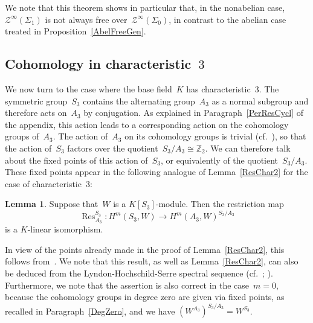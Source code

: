 \documentclass[12pt]{article}
\makeatletter
\theoremstyle{definition}
\newtheorem{Lemma}[Satz]{Lemma}
\theoremstyle{break}
\renewenvironment{proof}[1][\proofname]{\par
\vspace{-5pt}%
\pushQED{\qed}%
\normalfont
\topsep0pt \partopsep0pt %
\trivlist
\item[\hskip\labelsep
\bfseries
#1\@addpunct{.}]\ignorespaces
}{%
\popQED\endtrivlist\@endpefalse
\addvspace{6pt plus 6pt} %
}
\newcommand{\Z}{\mathbb{Z}}
\DeclareMathOperator\Res{Res}
\renewcommand{\1}{\mathbbm{1}}
\newcommand{\TFT}{\mathcal{Z}}
\makeatother
\begin{document}
We note that this theorem shows in particular that, in the nonabelian case,~$\TFT^\infty(\Sigma_1)$ is not always free over~$\TFT^\infty(\Sigma_0)$, in contrast to the abelian case treated in Proposition~\ref{AbelFreeGen}.


\subsection{Cohomology in characteristic~$3$} \label{Char3}
We now turn to the case where the base field~$K$ has characteristic~$3$. The symmetric group~$S_3$ contains the alternating group~$A_3$ as a normal subgroup and therefore acts on~$A_3$ by conjugation. As explained in Paragraph~\ref{PerResCycl} of the appendix, this action leads to a corresponding action on the cohomology groups of~$A_3$. The action of~$A_3$ on its cohomology groups is trivial (cf.~\cite[Prop.~4.1.1, p.~36]{E}), so that the action of~$S_3$ factors over the quotient~$S_3/A_3 \cong \Z_2$. We can therefore talk about the fixed points of this action of~$S_3$, or equivalently of the quotient~$S_3/A_3$. These fixed points appear in the following analogue of Lemma~\ref{ResChar2} for the case of characteristic~$3$:
\begin{Lemma} \label{ResChar3}
Suppose that~$W$ is a $K[S_3]$-module. Then the restriction map
\[\Res^{S_3}_{A_3} \colon H^m(S_3, W) \to H^m(A_3, W)^{S_3/A_3}\]
is a $K$-linear isomorphism.
\end{Lemma}
\begin{proof}
In view of the points already made in the proof of Lemma~\ref{ResChar2}, this follows from~\cite[Chap.~III, Thm.~(10.3), p.~84]{Br}. We note that this result, as well as Lemma~\ref{ResChar2}, can also be deduced from the Lyndon-Hochschild-Serre spectral sequence (cf.~\cite[Chap.~III, \S~2, Thm.~1, p.~127]{HoS}; \cite[Chap.~XI, \S~10, Cor.~10.3, p.~354]{ML1}). Furthermore, we note that the assertion is also correct in the case~$m=0$, because the cohomology groups in degree zero are given via fixed points, as recalled in Paragraph~\ref{DegZero}, and we have
$(W^{A_3})^{S_3/A_3} = W^{S_3}$.
\end{proof}
\end{document}
